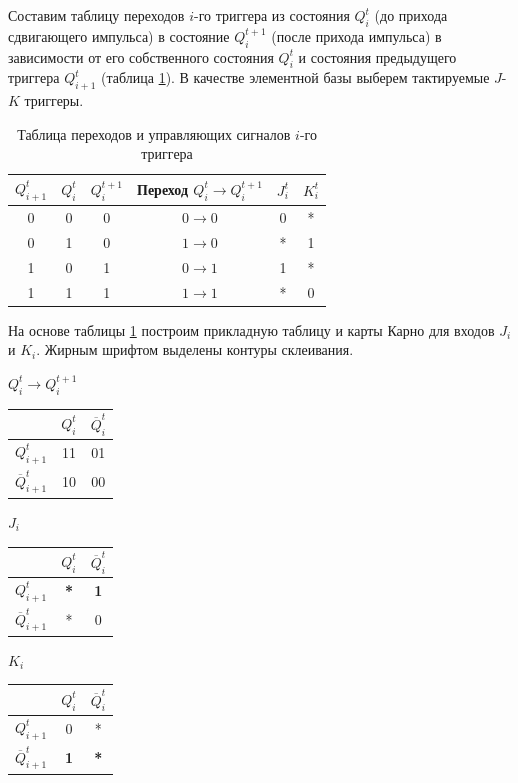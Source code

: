 \documentclass[14pt, a4paper]{extarticle}
\begin{document}
Составим таблицу переходов $i$-го триггера из состояния $Q_i^t$ (до прихода сдвигающего импульса) в состояние $Q_i^{t+1}$ (после прихода импульса) в зависимости от его собственного состояния $Q_i^t$ и состояния предыдущего триггера $Q_{i+1}^t$ (таблица \ref{tab:trans}). В качестве элементной базы выберем тактируемые $J$-$K$ триггеры.

\begin{table}[H]
	\centering
	\begin{tabular}{|c|c|c|c|c|c|}
		\hline
		$Q_{i+1}^t$ & $Q_i^t$ & $Q_i^{t+1}$ & Переход $Q_i^t \to Q_i^{t+1}$ & $J_i^t$ & $K_i^t$ \\ \hline
		0 & 0 & 0 & $0 \to 0$ & 0 & * \\ \hline
		0 & 1 & 0 & $1 \to 0$ & * & 1 \\ \hline
		1 & 0 & 1 & $0 \to 1$ & 1 & * \\ \hline
		1 & 1 & 1 & $1 \to 1$ & * & 0 \\ \hline
	\end{tabular}
	\caption{Таблица переходов и управляющих сигналов $i$-го триггера}
	\label{tab:trans}
\end{table}

На основе таблицы \ref{tab:trans} построим прикладную таблицу и карты Карно для входов $J_i$ и $K_i$. Жирным шрифтом выделены контуры склеивания.

\begin{center}
	\small
	\begin{minipage}{0.32\textwidth}
		\centering
		\textbf{$Q_i^t \to Q_i^{t+1}$}\\[4pt]
		\begin{tabular}{|c|c|c|}
			\hline
			& $Q_i^t$ & $\overline{Q}_i^t$ \\ \hline
			$Q_{i+1}^t$ & 11 & 01 \\ \hline
			$\overline{Q}_{i+1}^t$ & 10 & 00 \\ \hline
		\end{tabular}
	\end{minipage}
	\hfill
	\begin{minipage}{0.32\textwidth}
		\centering
		\textbf{$J_i$}\\[4pt]
		\begin{tabular}{|c|c|c|}
			\hline
			& $Q_i^t$ & $\overline{Q}_i^t$ \\ \hline
			$Q_{i+1}^t$ & \textbf{*} & \textbf{1} \\ \hline
			$\overline{Q}_{i+1}^t$ & * & 0 \\ \hline
		\end{tabular}
	\end{minipage}
	\hfill
	\begin{minipage}{0.32\textwidth}
		\centering
		\textbf{$K_i$}\\[4pt]
		\begin{tabular}{|c|c|c|}
			\hline
			& $Q_i^t$ & $\overline{Q}_i^t$ \\ \hline
			$Q_{i+1}^t$ & 0 & * \\ \hline
			$\overline{Q}_{i+1}^t$ & \textbf{1} & \textbf{*} \\ \hline
		\end{tabular}
	\end{minipage}
\end{center}
\end{document}
